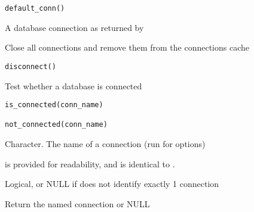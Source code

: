 \documentclass[a4paper]{book}
\begin{document}
%
\begin{Usage}
\begin{verbatim}
default_conn()
\end{verbatim}
\end{Usage}
%
\begin{Value}
A database connection as returned by 
\end{Value}
%
\begin{Description}\relax
Close all connections and remove them from the connections cache
\end{Description}
%
\begin{Usage}
\begin{verbatim}
disconnect()
\end{verbatim}
\end{Usage}
%
\begin{Description}\relax
Test whether a database is connected
\end{Description}
%
\begin{Usage}
\begin{verbatim}
is_connected(conn_name)

not_connected(conn_name)
\end{verbatim}
\end{Usage}
%
\begin{Arguments}
\begin{ldescription}
\item[\code{conn\_name}] Character. The name of a connection (run
 for options)
\end{ldescription}
\end{Arguments}
%
\begin{Details}\relax
{} is provided for readability, and is identical to .
\end{Details}
%
\begin{Value}
Logical, or NULL if  does not identify exactly 1
connection
\end{Value}
%
\begin{Description}\relax
Return the named connection or NULL
\end{Description}
\end{document}

